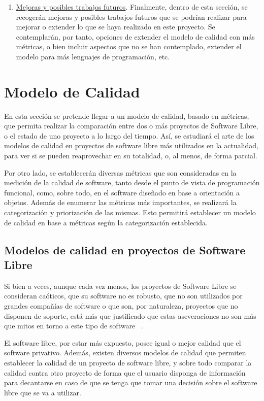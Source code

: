 \documentclass[11pt]{article}
\begin{document}
\begin{enumerate}
\item{\underline{Mejoras y posibles trabajos futuros}}. Finalmente, dentro de esta sección, se recogerán mejoras y posibles trabajos futuros que se podrían realizar para mejorar o extender lo que se haya realizado en este proyecto. Se contemplarán, por tanto, opciones de extender el modelo de calidad con más métricas, o bien incluir aspectos que no se han contemplado, extender el modelo para más lenguajes de programación, etc.
\end{enumerate}

\section{Modelo de Calidad}
En esta sección se pretende llegar a un modelo de calidad, basado en métricas, que permita realizar la comparación entre dos o más proyectos de Software Libre, o el estado de uno proyecto a lo largo del tiempo. Así, se estudiará el arte de los modelos de calidad en proyectos de software libre más utilizados en la actualidad, para ver si se pueden reaprovechar en su totalidad, o, al menos, de forma parcial.

Por otro lado, se establecerán diversas métricas que son consideradas en la medición de la calidad de software, tanto desde el punto de vista de programación funcional, como, sobre todo, en el software diseñado en base a orientación a objetos. Además de enumerar las métricas más importantes, se realizará la categorización y priorización de las mismas. Esto permitirá establecer un modelo de calidad en base a métricas según la categorización establecida.

\subsection{Modelos de calidad en proyectos de Software Libre}

Si bien a veces, aunque cada vez menos, los proyectos de Software Libre se consideran caóticos, que su software no es robusto, que no son utilizados por grandes compañías de software o que son, por naturaleza, proyectos que no disponen de soporte, está más que justificado que estas aseveraciones no son más que mitos en torno a este tipo de software ~\cite{oreilly:tenmythsaboutopensourcesoftware}.

El software libre, por estar más expuesto, posee igual o mejor calidad que el software privativo. Además, existen diversos modelos de calidad que permiten establecer la calidad de un proyecto de software libre, y sobre todo comparar la calidad contra otro proyecto de forma que el usuario disponga de información para decantarse en caso de que se tenga que tomar una decisión sobre el software libre que se va a utilizar.
\end{document}
